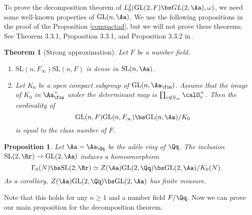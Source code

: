 \documentclass{article}
\newtheorem{theorem}{Theorem}[section]
\newcommand{\GL}{\mathrm{GL}}
\newcommand{\SL}{\mathrm{SL}}
\newtheorem{proposition}{Proposition}[section]
\begin{document}
To prove the decomposition theorem of $L^{2}_{0}(\GL(2, F) \bs GL(2, \Aa), \omega)$, we need some well-known properties of $\GL(n, \Aa)$. 
We use the following propositions in the proof of the Proposition \ref{compactad}, but we will not prove these theorems. See Theorem 3.3.1, Proposition 3.3.1, and Proposition 3.3.2 in \cite{bu}. 



\begin{theorem}[Strong approximation]
Let $F$ be a number field. 
\begin{enumerate}
\item $\SL(n, F_{\infty})\SL(n, F)$ is dense in $\SL(n, \Aa)$. 
\item Let $K_{0}$ be a open compact subgroup of $\GL(n, \Aa_{\fin})$. Assume that the image of $K_{0}$ in $\Aa_{\fin}^{\times}$ under the determinant map is $\prod_{v\not\in S_{\infty}} \calO_{v}^{\times}$. Then the cardinality of 
$$
\GL(n, F)\GL(n, F_{\infty})\bs \GL(n, \Aa)/K_{0}
$$
is equal to the class number of $F$. 
\end{enumerate}
\end{theorem}

\begin{proposition}
Let $\Aa = \Aa_{\Qq}$ be the ad\'ele ring of $\Qq$. The inclusion $\SL(2, \Rr)\to \GL(2, \Aa)$ induces a homeomorphism 
$$
\Gamma_{0}(N) \bs \SL(2, \Rr) \simeq Z(\Aa) \GL(2, \Qq) \bs \GL(2, \Aa) /K_{0}(N).
$$
As a corollary, $Z(\Aa)\GL(2, \Qq) \bs \GL(2, \Aa)$ has finite measure. 
\end{proposition}
Note that this holds for any $n \geq 1$ and a number field $F/\Qq$. 
Now we can prove our main proposition for the decomposition theorem. 
\end{document}
